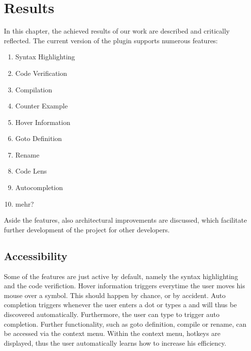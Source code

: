 \section{Results}


\label{section:results}
In this chapter, the achieved results of our work are described and critically reflected.
The current version of the plugin supports numerous features:
\begin{enumerate}
    \item Syntax Highlighting
    \item Code Verification
    \item Compilation
    \item Counter Example
    \item Hover Information
    \item Goto Definition
    \item Rename
    \item Code Lens
    \item Autocompletion
    \item mehr?
\end{enumerate}


Aside the features, also architectural improvements are discussed,
which facilitate further development of the project for other developers.


\subsection{Accessibility}
Some of the features are just active by default, namely the syntax highlighting and the code verifiction.
Hover information triggers everytime the user moves his mouse over a symbol.
This should happen by chance, or by accident.
Auto completion triggers whenever the user enters a dot or types a  and will thus be discovered automatically.
Furthermore, the user can type  to trigger auto completion.
Further functionality, such as goto definition, compile or rename, can be accessed via the context menu.
Within the context menu, hotkeys are displayed, thus the user automatically learns how to increase his efficiency.

